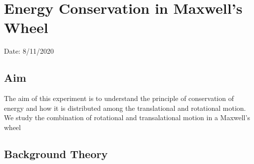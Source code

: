 \chapter{Energy Conservation in Maxwell’s Wheel}

Date: 8/11/2020

\section{Aim}

The aim of this experiment is to understand the principle of conservation of energy and how it is distributed among the translational and rotational motion. We study the combination of rotational and transalational motion in a Maxwell's wheel




\section{Background Theory}

